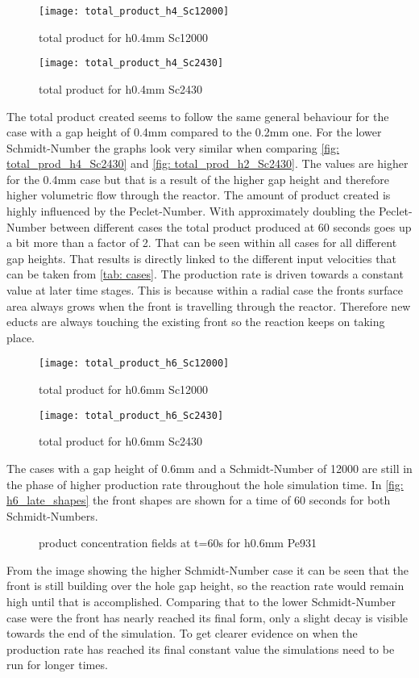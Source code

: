 \documentclass[../thesis.tex]{subfiles}
\begin{document}
\begin{figure}[htbp]
	\centering
	\texttt{[image: total\_product\_h4\_Sc12000]}
	\caption{total product for h0.4mm Sc12000\label{fig: total_prod_h4_Sc12000}}\bigskip
	\texttt{[image: total\_product\_h4\_Sc2430]}
	\caption{total product for h0.4mm Sc2430\label{fig: total_prod_h4_Sc2430}}
\end{figure}

The total product created seems to follow the same general behaviour for the case with a gap height of 0.4mm compared to the 0.2mm one. For the lower Schmidt-Number the graphs look very similar when comparing \autoref{fig: total_prod_h4_Sc2430} and \autoref{fig: total_prod_h2_Sc2430}. The values are higher for the 0.4mm case but that is a result of the higher gap height and therefore higher volumetric flow through the reactor. The amount of product created is highly influenced by the Peclet-Number. With approximately doubling the Peclet-Number between different cases the total product produced at 60 seconds goes up a bit more than a factor of 2. That can be seen within all cases for all different gap heights. That results is directly linked to the different input velocities that can be taken from \autoref{tab: cases}. The production rate is driven towards a constant value at later time stages. This is because within a radial case the fronts surface area always grows when the front is travelling through the reactor. Therefore new educts are always touching the existing front so the reaction keeps on taking place.
\begin{figure}[htbp]
	\centering
	\texttt{[image: total\_product\_h6\_Sc12000]}
	\caption{total product for h0.6mm Sc12000\label{fig: total_prod_h6_Sc12000}}\bigskip
	\texttt{[image: total\_product\_h6\_Sc2430]}
	\caption{total product for h0.6mm Sc2430\label{fig: total_prod_h6_Sc2430}}
\end{figure}
\newline
The cases with a gap height of 0.6mm and a Schmidt-Number of 12000 are still in the phase of higher production rate throughout the hole simulation time. In \autoref{fig: h6_late_shapes} the front shapes are shown for a time of 60 seconds for both Schmidt-Numbers.
\begin{figure}[htb]
	\centering
	\qquad
	\caption{product concentration fields at t=60s for h0.6mm Pe931}%
	\label{fig: h6_late_shapes}%
\end{figure}
From the image showing the higher Schmidt-Number case it can be seen that the front is still building over the hole gap height, so the reaction rate would remain high until that is accomplished. Comparing that to the lower Schmidt-Number case were the front has nearly reached its final form, only a slight decay is visible towards the end of the simulation. To get clearer evidence on when the production rate has reached its final constant value the simulations need to be run for longer times.
\end{document}

